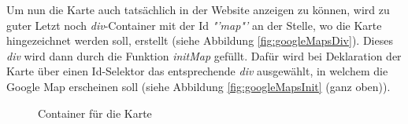Um nun die Karte auch tatsächlich in der Website anzeigen zu können, wird zu guter Letzt noch \textit{div}-Container mit der Id \textit{"'map"'} an der Stelle, wo die Karte hingezeichnet werden soll, erstellt (siehe Abbildung \vref{fig:googleMapsDiv}). Dieses \textit{div} wird dann durch die Funktion \textit{initMap} gefüllt. Dafür wird bei Deklaration der Karte über einen Id-Selektor das entsprechende \textit{div} ausgewählt, in welchem die Google Map erscheinen soll (siehe Abbildung \vref{fig:googleMapsInit} (ganz oben)).

\begin{figure}[!h]
	\caption{Container für die Karte}
	\label{fig:googleMapsDiv}
\end{figure}

